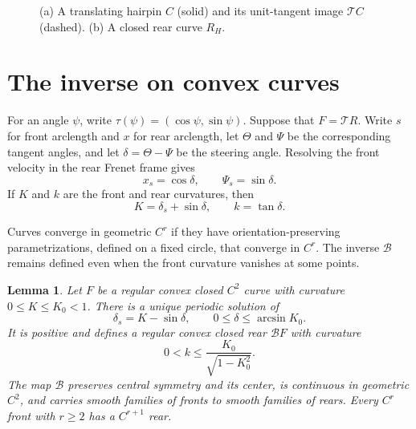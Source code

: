 \documentclass[11pt]{article}
\numberwithin{equation}{section}
\newtheorem{lemma}[theorem]{Lemma}
\newcommand{\Tmap}{\mathcal T}
\newcommand{\Bmap}{\mathcal B}
\begin{document}
\begin{figure}[tb]
\caption{(a) A translating hairpin \(C\) (solid) and its unit-tangent image \(\Tmap C\) (dashed). (b) A closed rear curve \(R_H\).}
\label{fig:construction}
\end{figure}


\section{The inverse on convex curves}\label{sec:inverse}

For an angle \(\psi\), write \(\tau(\psi)=(\cos\psi,\sin\psi)\). Suppose that
\(F=\Tmap R\). Write \(s\) for front arclength and \(x\) for rear arclength,
let \(\Theta\) and \(\Psi\) be the corresponding tangent angles, and let
\(\delta=\Theta-\Psi\) be the steering angle. Resolving the front velocity in
the rear Frenet frame gives
\[
  x_s=\cos\delta,\qquad \Psi_s=\sin\delta.
\]
If \(K\) and \(k\) are the front and rear curvatures, then
\[
  K=\delta_s+\sin\delta,\qquad k=\tan\delta.
\]

Curves converge in geometric \(C^r\) if they have orientation-preserving
parametrizations, defined on a fixed circle, that converge in \(C^r\). The
inverse \(\Bmap\) remains defined even when the front curvature vanishes at
some points.

\begin{lemma}\label{lem:inverse}
Let \(F\) be a regular convex closed \(C^2\) curve with curvature
\(0\leq K\leq K_0<1\). There is a unique periodic solution of
\[
  \delta_s=K-\sin\delta,\qquad 0\leq\delta\leq\arcsin K_0.
\]
It is positive and defines a regular convex closed rear
\(\Bmap F\) with curvature
\[
  0<k\leq\frac{K_0}{\sqrt{1-K_0^2}}.
\]
The map \(\Bmap\) preserves central symmetry and its center, is continuous in
geometric \(C^2\), and carries smooth families of fronts to smooth families of
rears. Every \(C^r\) front with \(r\geq2\) has a \(C^{r+1}\) rear.
\end{lemma}
\end{document}
